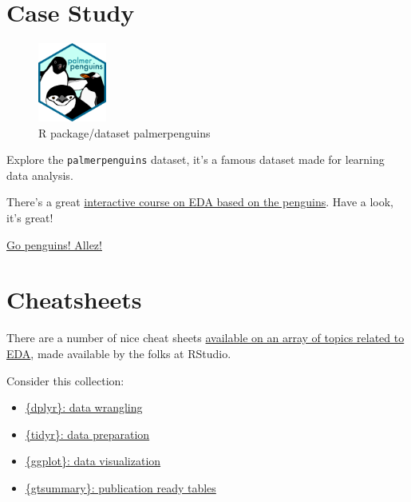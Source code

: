 \documentclass[
  letterpaper,
  DIV=11,
  numbers=noendperiod]{scrreprt}
\theoremstyle{definition}
\theoremstyle{definition}
\theoremstyle{remark}
\begin{document}
\hypertarget{case-study-2}{%
\section{Case Study}\label{case-study-2}}

\begin{figure}

{\centering \includegraphics[width=0.2\textwidth,height=\textheight]{./img/palmerpenguins-logo.png}

}

\caption{R package/dataset palmerpenguins}

\end{figure}

Explore the \texttt{palmerpenguins} dataset, it's a famous dataset made
for learning data analysis.

There's a great
\href{https://allisonhorst.shinyapps.io/dplyr-learnr/\#section-welcome}{interactive
course on EDA based on the penguins}. Have a look, it's great!

\href{https://media.giphy.com/media/3og0IO5z8Rd30ktV6g/giphy.gif}{Go
penguins! Allez!}

\hypertarget{cheatsheets}{%
\section{Cheatsheets}\label{cheatsheets}}

There are a number of nice cheat sheets
\href{https://www.rstudio.com/resources/cheatsheets/}{available on an
array of topics related to EDA}, made available by the folks at RStudio.

Consider this collection:

\begin{itemize}
\item
  \href{https://raw.githubusercontent.com/rstudio/cheatsheets/main/pngs/data-transformation.png}{\{dplyr\}:
  data wrangling}
\item
  \href{https://raw.githubusercontent.com/rstudio/cheatsheets/main/pngs/tidyr.png}{\{tidyr\}:
  data preparation}
\item
  \href{https://raw.githubusercontent.com/rstudio/cheatsheets/main/pngs/data-visualization.png}{\{ggplot\}:
  data visualization}
\item
  \href{https://raw.githubusercontent.com/rstudio/cheatsheets/main/pngs/gtsummary.png}{\{gtsummary\}:
  publication ready tables}
\end{itemize}
\end{document}
